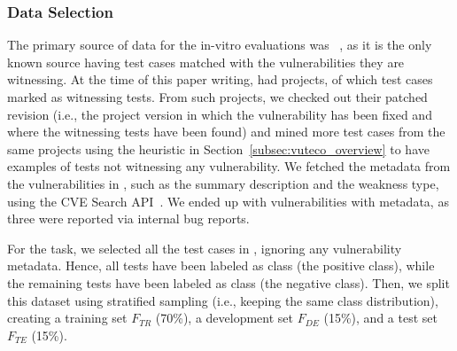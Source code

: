\subsubsection{Data Selection}
\label{subsubsec:data}

The primary source of data for the in-vitro evaluations was \VulforJ~\cite{bui:msr2022:vul4j}, as it is the only known source having \JUnit test cases matched with the vulnerabilities they are witnessing.
%
At the time of this paper writing, \VulforJ had \vulforjProjects \Java projects, of which \vulforjWitTests \JUnit test cases marked as witnessing tests.
From such projects, we checked out their patched revision (i.e., the project version in which the vulnerability has been fixed and where the witnessing tests have been found) and mined \vulforjNotTests more test cases from the same projects using the heuristic in Section~\ref{subsec:vuteco_overview} to have examples of tests not witnessing any vulnerability.
We fetched the metadata from the \vulforjVulns vulnerabilities in \VulforJ, such as the summary description and the weakness type, using the CVE Search API~\cite{cve:search}.
We ended up with \vulforjVulnsWithMetadata vulnerabilities with metadata, as three were reported via internal bug reports.

For the \finding task, we selected all the \JUnit test cases in \VulforJ, ignoring any vulnerability metadata.
Hence, all \vulforjWitTests tests have been labeled as \finderPosClass class (the positive class), while the remaining \vulforjNotTests tests have been labeled as \finderNegClass class (the negative class).
Then, we split this dataset using stratified sampling (i.e., keeping the same class distribution), creating a training set $F_{TR}$ (70\%), a development set $F_{DE}$ (15\%), and a test set $F_{TE}$ (15\%).

